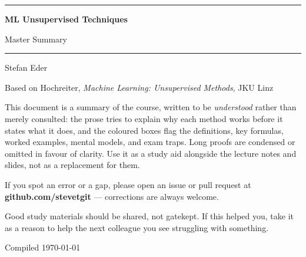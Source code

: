 \documentclass[11pt, oneside]{book}
\newcommand{\coursetitle}{ML Unsupervised Techniques}
\newcommand{\documenttype}{Master Summary}
\newcommand{\authorname}{Stefan Eder}
\newcommand{\basedon}{Based on Hochreiter, \emph{Machine Learning: Unsupervised Methods}, JKU Linz}
\begin{document}
\frontmatter


\thispagestyle{empty}
\vspace*{1.8cm}

\begin{center}
  {\color{accent}\rule{\linewidth}{1.8pt}}
  \vspace{0.65cm}

  {\fontsize{28}{34}\selectfont\bfseries\color{accent}\coursetitle\par}
  \vspace{0.25cm}
  {\large\color{gray!80!black}\documenttype\par}

  \vspace{0.55cm}
  {\color{accent!35}\rule{\linewidth}{0.5pt}}
  \vspace{0.55cm}

  {\large\authorname\par}
  \vspace{0.2cm}
  {\small\color{gray!70}\basedon\par}
\end{center}

\vspace{1.6cm}

\begin{center}
\begin{minipage}{0.84\textwidth}
  \small\color{gray!80!black}
  This document is a summary of the course, written to be \emph{understood} rather
  than merely consulted: the prose tries to explain why each method works before
  it states what it does, and the coloured boxes flag the definitions, key
  formulas, worked examples, mental models, and exam traps.
  Long proofs are condensed or omitted in favour of clarity.
  Use it as a study aid alongside the lecture notes and slides, not as a
  replacement for them.

  \medskip
  If you spot an error or a gap, please open an issue or pull request at
  \textbf{github.com/stevetgit} --- corrections are always welcome.

  \medskip
  \color{gray!60!black}
  Good study materials should be shared, not gatekept.
  If this helped you, take it as a reason to help the next colleague you see struggling with something.
\end{minipage}
\end{center}

\vfill
{\centering\small\color{gray!65} Compiled \today\par}
\clearpage
\end{document}
